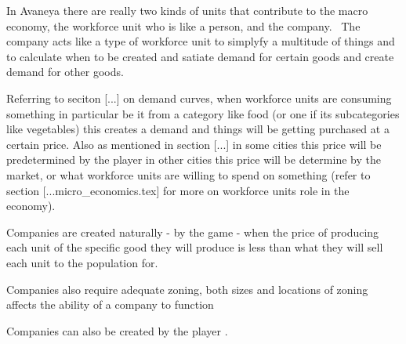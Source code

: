 


In Avaneya there are really two kinds of units that contribute to the macro economy, the workforce unit who is like a person, and the company. \
The company acts like a type of workforce unit to simplyfy a multitude of things and to calculate when to be created and satiate demand for certain goods and create demand for other goods. 


Referring to seciton [...] on demand curves, when workforce units are consuming something in particular be it from a category like food (or one if its subcategories like vegetables) this creates a demand and things will be getting purchased at a certain price. Also as mentioned in section [...] in some cities this price will be predetermined by the player in other cities this price will be determine by the market, or what workforce units are willing to spend on something (refer to section [...micro_economics.tex] for more on workforce units role in the economy).

Companies are created naturally - by the game - when the price of producing each unit of the specific good they will produce is less than what they will sell each unit to the population for.


Companies also require adequate zoning, both sizes and locations of zoning affects the ability of a company to function 


Companies can also be created by the player .










